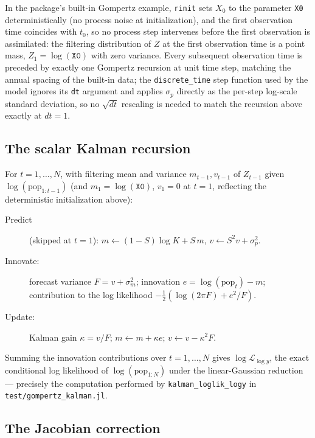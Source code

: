 \documentclass[11pt]{article}
\begin{document}
In the package's built-in Gompertz example, \texttt{rinit} sets $X_0$ to the
parameter \texttt{X0} deterministically (no process noise at
initialization), and the first observation time coincides with $t_0$, so no
process step intervenes before the first observation is assimilated: the
filtering distribution of $Z$ at the first observation time is a point mass,
$Z_1 = \log(\texttt{X0})$ with zero variance. Every subsequent observation
time is preceded by exactly one Gompertz recursion at unit time step,
matching the annual spacing of the built-in data; the \texttt{discrete\_time}
step function used by the model ignores its \texttt{dt} argument and applies
$\sigma_p$ directly as the per-step log-scale standard deviation, so no
$\sqrt{dt}$ rescaling is needed to match the recursion above exactly at
$dt=1$.

\subsection{The scalar Kalman recursion}

For $t=1,\dots,N$, with filtering mean and variance $m_{t-1},v_{t-1}$ of
$Z_{t-1}$ given $\log(\mathrm{pop}_{1:t-1})$ (and $m_1=\log(\texttt{X0})$,
$v_1=0$ at $t=1$, reflecting the deterministic initialization above):

\begin{description}
\item[Predict] (skipped at $t=1$): $m \leftarrow (1-S)\log K + S\,m$,
\quad $v \leftarrow S^2 v + \sigma_p^2$.
\item[Innovate:] forecast variance $F = v+\sigma_m^2$; innovation
$e = \log(\mathrm{pop}_t) - m$; contribution to the log likelihood
$-\tfrac12\left(\log(2\pi F) + e^2/F\right)$.
\item[Update:] Kalman gain $\kappa = v/F$; $m\leftarrow m+\kappa e$;
$v \leftarrow v - \kappa^2 F$.
\end{description}

Summing the innovation contributions over $t=1,\dots,N$ gives
$\log\mathcal{L}_{\log y}$, the exact conditional log likelihood of
$\log(\mathrm{pop}_{1:N})$ under the linear-Gaussian reduction — precisely
the computation performed by \texttt{kalman\_loglik\_logy} in
\texttt{test/gompertz\_kalman.jl}.

\subsection{The Jacobian correction}
\end{document}
